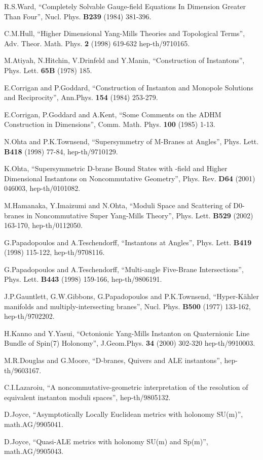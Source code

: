 \documentclass[a4paper,12pt]{article}
\begin{document}
\begin{thebibliography}{999}
R.S.Ward, ``Completely Solvable Gauge-field Equations In Dimension
Greater Than Four'', Nucl. Phys. \textbf{B239} (1984) 381-396.

C.M.Hull, ``Higher Dimensional Yang-Mills Theories and Topological Terms'', 
Adv. Theor. Math. Phys. \textbf{2} (1998) 619-632 hep-th/9710165.

M.Atiyah, N.Hitchin, V.Drinfeld and Y.Manin, ``Construction of Instantons'',
 Phys. Lett. \textbf{65B} (1978) 185.

E.Corrigan and P.Goddard, ``Construction of Instanton and Monopole Solutions
 and Reciprocity'', Ann.Phys. \textbf{154} (1984) 253-279.

E.Corrigan, P.Goddard and A.Kent, ``Some Comments on the ADHM Construction
 in \coordHE{} Dimensions'', Comm. Math. Phys. \textbf{100} (1985) 1-13.

N.Ohta and P.K.Townsend, ``Supersymmetry of M-Branes at Angles'', 
Phys. Lett. \textbf{B418} (1998) 77-84, hep-th/9710129.

K.Ohta, ``Supersymmetric D-brane Bound States with \coordHE{}-field and
Higher Dimensional Instantons on Noncommutative Geometry'',
 Phys. Rev. \textbf{D64} (2001) 046003,
 hep-th/0101082.

M.Hamanaka, Y.Imaizumi and N.Ohta, ``Moduli Space and Scattering of D0-branes 
in Noncommutative Super Yang-Mills Theory'', Phys. Lett. 
\textbf{B529} (2002) 163-170, hep-th/0112050.

G.Papadopoulos and A.Teschendorff, ``Instantons at Angles'', Phys. Lett.
 \textbf{B419} (1998) 115-122, hep-th/9708116.

G.Papadopoulos and A.Teschendorff, ``Multi-angle Five-Brane Intersections'',
 Phys. Lett. \textbf{B443} (1998) 159-166, hep-th/9806191.

J.P.Gauntlett, G.W.Gibbons, G.Papadopoulos and P.K.Townsend, 
``Hyper-K\"{a}hler manifolds and multiply-intersecting branes'', 
Nucl. Phys. \textbf{B500} (1977) 133-162, hep-th/9702202.

H.Kanno and Y.Yasui, ``Octonionic Yang-Mills Instanton on Quaternionic Line 
Bundle of Spin(7) Holonomy'', J.Geom.Phys. \textbf{34} (2000) 302-320 
hep-th/9910003.

M.R.Douglas and G.Moore, ``D-branes, Quivers and ALE instantons'', 
hep-th/9603167.

C.I.Lazaroiu, ``A noncommutative-geometric interpretation of the 
resolution of equivalent instanton moduli spaces'', hep-th/9805132.

D.Joyce, ``Asymptotically Locally Euclidean metrics with holonomy SU(m)'', 
math.AG/9905041.

D.Joyce, ``Quasi-ALE metrics with holonomy SU(m) and Sp(m)'', 
math.AG/9905043.


\end{thebibliography}
\end{document}
